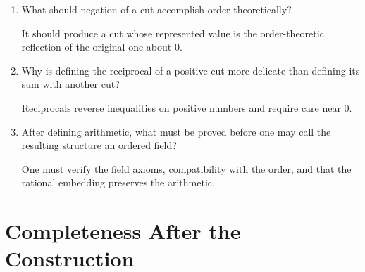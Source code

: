 \documentclass{self-check}
\begin{document}
\begin{enumerate}[label=\arabic{*}., itemsep=10pt]
    \begin{answer}
      \[ A_{r}=\{q\in\mathbb{Q}:q<r\}. \]
    \end{answer}
  \item What should negation of a cut accomplish order-theoretically?

    \begin{answer}
      It should produce a cut whose represented value is the order-theoretic reflection of the original one about \(0\).
    \end{answer}
  \item Why is defining the reciprocal of a positive cut more delicate than defining its sum with another cut?

    \begin{answer}
      Reciprocals reverse inequalities on positive numbers and require care near \(0\).
    \end{answer}
  \item After defining arithmetic, what must be proved before one may call the resulting structure an ordered field?

    \begin{answer}
      One must verify the field axioms, compatibility with the order, and that the rational embedding preserves the arithmetic.
    \end{answer}
\end{enumerate}

\section{Completeness After the Construction}
\end{document}
